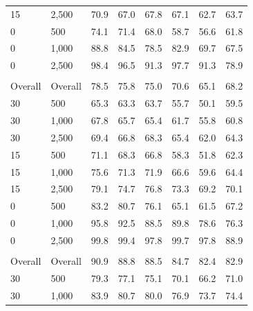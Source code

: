 \documentclass[twoside,11pt]{article}\usepackage[]{graphicx}\usepackage[]{xcolor}
\newenvironment{knitrout}{}{} %
\begin{document}
\begin{knitrout}
\begin{landscape}
\begin{longtable}[t]{llcccccc}
\hspace{1em}15 & 2,500 & 70.9 & 67.0 & 67.8 & 67.1 & 62.7 & 63.7\\
\hspace{1em}0 & 500 & 74.1 & 71.4 & 68.0 & 58.7 & 56.6 & 61.8\\
\hspace{1em}0 & 1,000 & 88.8 & 84.5 & 78.5 & 82.9 & 69.7 & 67.5\\
\hspace{1em}0 & 2,500 & 98.4 & 96.5 & 91.3 & 97.7 & 91.3 & 78.9\\
\addlinespace[0.3em]
\multicolumn{8}{l}{\textit{\textbf{Combination effects}}}\\
\hline
\hspace{1em}Overall & Overall & 78.5 & 75.8 & 75.0 & 70.6 & 65.1 & 68.2\\
\hspace{1em}30 & 500 & 65.3 & 63.3 & 63.7 & 55.7 & 50.1 & 59.5\\
\hspace{1em}30 & 1,000 & 67.8 & 65.7 & 65.4 & 61.7 & 55.8 & 60.8\\
\hspace{1em}30 & 2,500 & 69.4 & 66.8 & 68.3 & 65.4 & 62.0 & 64.3\\
\hspace{1em}15 & 500 & 71.1 & 68.3 & 66.8 & 58.3 & 51.8 & 62.3\\
\hspace{1em}15 & 1,000 & 75.6 & 71.3 & 71.9 & 66.6 & 59.6 & 64.4\\
\hspace{1em}15 & 2,500 & 79.1 & 74.7 & 76.8 & 73.3 & 69.2 & 70.1\\
\hspace{1em}0 & 500 & 83.2 & 80.7 & 76.1 & 65.1 & 61.5 & 67.2\\
\hspace{1em}0 & 1,000 & 95.8 & 92.5 & 88.5 & 89.8 & 78.6 & 76.3\\
\hspace{1em}0 & 2,500 & 99.8 & 99.4 & 97.8 & 99.7 & 97.8 & 88.9\\
\addlinespace[0.3em]
\multicolumn{8}{l}{\textit{\textbf{Main effects}}}\\
\hline
\hspace{1em}Overall & Overall & 90.9 & 88.8 & 88.5 & 84.7 & 82.4 & 82.9\\
\hspace{1em}30 & 500 & 79.3 & 77.1 & 75.1 & 70.1 & 66.2 & 71.0\\
\hspace{1em}30 & 1,000 & 83.9 & 80.7 & 80.0 & 76.9 & 73.7 & 74.4\\

\end{longtable}
\end{landscape}
\end{knitrout}
\end{document}
